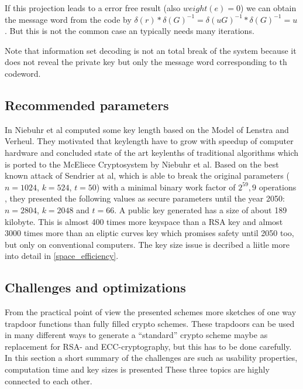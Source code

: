  If this projection leads to a error free result (also $weight(e) = 0$) we can obtain the message word from the code by $\delta(r)* \delta(G)^{-1} = \delta(uG)^{-1}*\delta(G)^{-1} = u$. 
 But this is not the common case an typically needs many iterations.
 
 Note that information set decoding is not an total break of the system because it does not reveal the private key but only the message word corresponding to th codeword. 


\subsection*{Recommended parameters}
In \cite{niebuhr2012selecting} Niebuhr et al computed some key length based on the Model of Lenstra and Verheul. They motivated that keylength have to grow with speedup of computer hardware and concluded state of the art keylenths of traditional algorithms which is ported to the McEliece Cryptosystem by Niebuhr et al. Based on the best known attack of Sendrier at al, which is able to break the original parameters ($n = 1024$, $k = 524$, $t = 50$) with a minimal binary work factor of $2^59,9$ operations \cite{finiasz2009security}, they presented the following values as secure parameters until the year 2050: $n = 2804$, $k = 2048$ and $t = 66$. A public key generated has a size of about 189 kilobyte. This is almost 400 times more keyspace than a RSA key and almost 3000 times more than an eliptic curves key which promises safety until 2050 too, but only on conventional computers. The key size issue is decribed a liitle more into detail in \ref{space_efficiency}.


\subsection*{Challenges and optimizations} %
From the practical point of view the presented schemes more sketches of one way trapdoor functions than fully filled crypto schemes. These trapdoors can be used in many different ways to generate a ``standard'' crypto scheme maybe as replacement for RSA- and ECC-cryptography, but this has to be done carefully. In this section a short summary of the challenges are such as usability properties, computation time and key sizes is presented  These three topics are highly connected to each other. 

